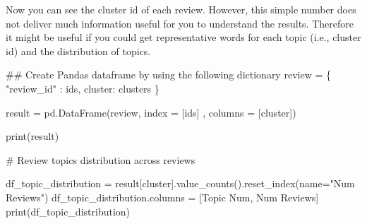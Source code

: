 \documentclass[
  letterpaper,
]{scrbook}
\newenvironment{Shaded}{\begin{snugshade}}{\end{snugshade}}
\newcommand{\BuiltInTok}[1]{\textcolor[rgb]{0.00,0.23,0.31}{#1}}
\newcommand{\CommentTok}[1]{\textcolor[rgb]{0.37,0.37,0.37}{#1}}
\newcommand{\NormalTok}[1]{\textcolor[rgb]{0.00,0.23,0.31}{#1}}
\newcommand{\OperatorTok}[1]{\textcolor[rgb]{0.37,0.37,0.37}{#1}}
\newcommand{\StringTok}[1]{\textcolor[rgb]{0.13,0.47,0.30}{#1}}
\begin{document}
Now you can see the cluster id of each review. However, this simple
number does not deliver much information useful for you to understand
the results. Therefore it might be useful if you could get
representative words for each topic (i.e., cluster id) and the
distribution of topics.

\begin{Shaded}
\begin{Highlighting}[]
\CommentTok{\#\# Create Pandas dataframe by using the following dictionary}
\NormalTok{review }\OperatorTok{=}\NormalTok{ \{ }\StringTok{"review\_id"}\NormalTok{ : ids, }\StringTok{\textquotesingle{}cluster\textquotesingle{}}\NormalTok{: clusters \}}

\NormalTok{result }\OperatorTok{=}\NormalTok{ pd.DataFrame(review, index }\OperatorTok{=}\NormalTok{ [ids] , columns }\OperatorTok{=}\NormalTok{ [}\StringTok{\textquotesingle{}cluster\textquotesingle{}}\NormalTok{])}

\BuiltInTok{print}\NormalTok{(result)}

\CommentTok{\# Review topics distribution across reviews}

\NormalTok{df\_topic\_distribution }\OperatorTok{=}\NormalTok{ result[}\StringTok{\textquotesingle{}cluster\textquotesingle{}}\NormalTok{].value\_counts().reset\_index(name}\OperatorTok{=}\StringTok{"Num Reviews"}\NormalTok{)}
\NormalTok{df\_topic\_distribution.columns }\OperatorTok{=}\NormalTok{ [}\StringTok{\textquotesingle{}Topic Num\textquotesingle{}}\NormalTok{, }\StringTok{\textquotesingle{}Num Reviews\textquotesingle{}}\NormalTok{]}
\BuiltInTok{print}\NormalTok{(df\_topic\_distribution)}
\end{Highlighting}
\end{Shaded}
\end{document}
